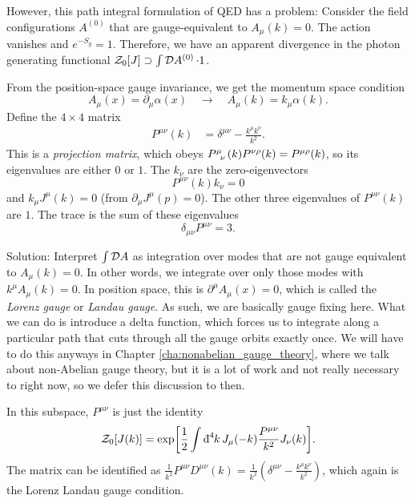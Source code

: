 However, this path integral formulation of QED has a problem: Consider the field configurations $A^{(0)}$ that are gauge-equivalent to $A_{\mu}(k) = 0$. The action vanishes and $e^{-S_g} = 1$. Therefore, we have an apparent divergence in the photon generating functional $\mathcal{Z}_0[J] \supset \int \pdd{A^{(0)}} \cdot 1$.

From the position-space gauge invariance, we get the momentum space condition
\begin{equation}
  A_{\mu}(x) = \partial_{\mu} \alpha(x) \quad \to \quad A_{\mu}(k) = k_{\mu} \alpha(k).
\end{equation}
Define the $4 \times 4$ matrix
\begin{align}
  P^{\mu\nu}(k) &= \delta^{\mu\nu} - \frac{k^{\mu} k^{\nu}}{k^2}.
\end{align}
This is a \emph{projection matrix}, which obeys $ P\indices{^{\mu}_{\nu}} (k) P^{\nu\rho}(k) = P^{\mu\rho}(k)$, so its eigenvalues are either $0$ or $1$.
The $k_{\nu}$ are the zero-eigenvectors
\begin{equation}
  P^{\mu\nu}(k) k_{\nu} = 0
\end{equation}
and $k_{\mu} J^{\mu}(k) = 0$ (from $\partial_{\mu} J^{\mu}(p) = 0$).
The other three eigenvalues of $P^{\mu\nu}(k)$ are $1$.
The trace is the sum of these eigenvalues
\begin{equation}
  \delta_{\mu\nu} P^{\mu\nu} = 3.
\end{equation}

Solution: Interpret $\int \pdd{A}$ as integration over modes that are not gauge equivalent to $A_{\mu}(k) = 0$.
In other words, we integrate over only those modes with $k^{\mu} A_{\mu}(k) = 0$.
In position space, this is $\partial^{\mu} A_{\mu}(x) = 0$, which is called the \emph{Lorenz gauge} or \emph{Landau gauge}.
As such, we are basically gauge fixing here.
What we can do is introduce a delta function, which forces us to integrate along a particular path that cuts through all the gauge orbits exactly once.
We will have to do this anyways in Chapter \ref{cha:nonabelian_gauge_theory}, where we talk about non-Abelian gauge theory, but it is a lot of work and not really necessary to right now, so we defer this discussion to then.

In this subspace, $P^{\mu\nu}$ is just the identity
\begin{equation}
  \mathcal{Z}_0[J(k)] = \exp[\frac{1}{2} \int \bdd[4]{k} J_{\mu}(-k) \frac{P^{\mu\nu}}{k^2} J_{\nu}(k)].
\end{equation}
The matrix can be identified as $\frac{1}{k^2} P^{\mu\nu}D^{\mu\nu}(k) = \frac{1}{k^2} (\delta^{\mu\nu} - \frac{k^{\mu} k^{\nu}}{k^2})$, which again is the Lorenz Landau gauge condition.

